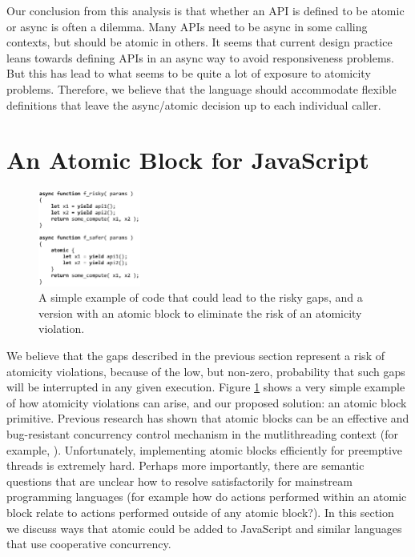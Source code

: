 \documentclass[sigplan,10pt,review,anonymous]{acmart}\settopmatter{printfolios=true,printccs=false,printacmref=false}
\begin{document}
Our conclusion from this analysis is that whether an API is defined to be atomic or async is often a dilemma.
Many APIs need to be async in some calling contexts, but should be atomic in others.
It seems that current design practice leans towards defining APIs in an async way to avoid responsiveness problems.
But this has lead to what seems to be quite a lot of exposure to atomicity problems.
Therefore, we believe that the language should accommodate flexible definitions that leave the async/atomic decision up to each individual caller.

\section{An Atomic Block for JavaScript}

\begin{figure}
\includegraphics[width=0.3\textwidth,left]{async_atomic_js}
\caption{A simple example of code that could lead to the risky gaps, and a version with an atomic block to eliminate the risk of an atomicity violation.}
\label{fig:async_atomic_js}
\end{figure}

We believe that the gaps described in the previous section represent a risk of atomicity violations, because of the low, but non-zero, probability that such gaps will be interrupted in any given execution.
Figure \ref{fig:async_atomic_js} shows a very simple example of how atomicity violations can arise, and our proposed solution: an atomic block primitive.
Previous research has shown that atomic blocks can be an effective and bug-resistant concurrency control mechanism in the mutlithreading context (for example, \cite{Harris2005, Grossman2007, Pankratius2014}).
Unfortunately, implementing atomic blocks efficiently for preemptive threads is extremely hard.
Perhaps more importantly, there are semantic questions that are unclear how to resolve satisfactorily for mainstream programming languages (for example how do actions performed within an atomic block relate to actions performed outside of any atomic block?).
In this section we discuss ways that atomic could be added to JavaScript and similar languages that use cooperative concurrency.
\end{document}
